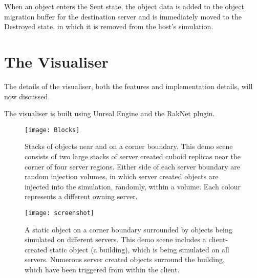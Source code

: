 When an object enters the Sent state, the object data is added to the object migration buffer for the destination server and is immediately moved to the Destroyed state, in which it is removed from the host's simulation.

\section{The Visualiser}
The details of the visualiser, both the features and implementation details, will now discussed.

The visualiser is built using Unreal Engine and the RakNet plugin.

\begin{figure}[!t]
	\centering
	\texttt{[image: Blocks]}
	\caption{Stacks of objects near and on a corner boundary. This demo scene consists of two large stacks of server created cuboid replicas near the corner of four server regions. Either side of each server boundary are random injection volumes, in which server created objects are injected into the simulation, randomly, within a volume. Each colour represents a different owning server.}
	\label{fig_screen1}
\end{figure}

\begin{figure}[!t]
	\centering
	\texttt{[image: screenshot]}
	\caption{A static object on a corner boundary surrounded by objects being simulated on different servers. This demo scene includes a client-created static object (a building), which is being simulated on all servers. Numerous server created objects surround the building, which have been triggered from within the client.}
	\label{fig_screen2}
\end{figure}

